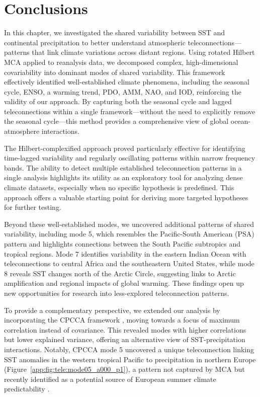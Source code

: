 \section{Conclusions}\label{sec:tele:conclusions}
In this chapter, we investigated the shared variability between SST and continental precipitation to better understand atmospheric teleconnections---patterns that link climate variations across distant regions. Using rotated Hilbert MCA applied to reanalysis data, we decomposed complex, high-dimensional covariability into dominant modes of shared variability. This framework effectively identified well-established climate phenomena, including the seasonal cycle, ENSO, a warming trend, PDO, AMM, NAO, and IOD, reinforcing the validity of our approach. By capturing both the seasonal cycle and lagged teleconnections within a single framework---without the need to explicitly remove the seasonal cycle---this method provides a comprehensive view of global ocean-atmosphere interactions.

The Hilbert-complexified approach proved particularly effective for identifying time-lagged variability and regularly oscillating patterns within narrow frequency bands. The ability to detect multiple established teleconnection patterns in a single analysis highlights its utility as an exploratory tool for analyzing dense climate datasets, especially when no specific hypothesis is predefined. This approach offers a valuable starting point for deriving more targeted hypotheses for further testing.

Beyond these well-established modes, we uncovered additional patterns of shared variability, including mode 5, which resembles the Pacific-South American (PSA) pattern and highlights connections between the South Pacific subtropics and tropical regions. Mode 7 identifies variability in the eastern Indian Ocean with teleconnections to central Africa and the southeastern United States, while mode 8 reveals SST changes north of the Arctic Circle, suggesting links to Arctic amplification and regional impacts of global warming. These findings open up new opportunities for research into less-explored teleconnection patterns.

To provide a complementary perspective, we extended our analysis by incorporating the CPCCA framework \cite{swenson_continuum_2015}, moving towards a focus of maximum correlation instead of covariance. This revealed modes with higher correlations but lower explained variance, offering an alternative view of SST-precipitation interactions. Notably, CPCCA mode 5 uncovered a unique teleconnection linking SST anomalies in the western tropical Pacific to precipitation in northern Europe (Figure~\ref{app:fig:tele:mode05_a000_p1}), a pattern not captured by MCA but recently identified as a potential source of European summer climate predictability \cite{straaten_correcting_2023}.


